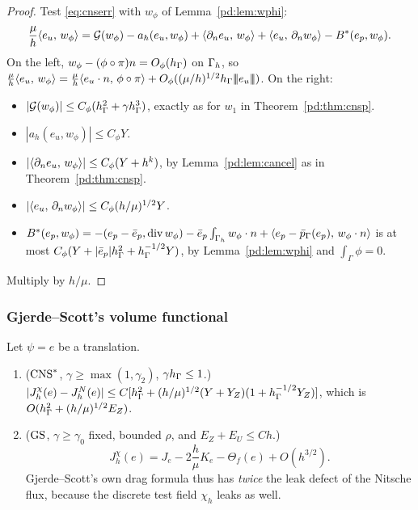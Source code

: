 \begin{proof}
Test \eqref{eq:cnserr} with $w_\phi$ of Lemma~\ref{pd:lem:wphi}:
\[
\frac\mu h\langle e_u,\, w_\phi\rangle=\mathcal G(w_\phi)-a_h(e_u,w_\phi)+\langle \partial_n e_u,\, w_\phi\rangle+\langle e_u,\, \partial_n w_\phi\rangle-B^\ast(e_p,w_\phi).
\]
On the left, $w_\phi-(\phi\circ\pi)n=O_\phi(h_\Gamma)$ on $\Gamma_h$, so $\frac\mu h\langle e_u,\, w_\phi\rangle=\frac\mu h\langle e_u\cdot n,\, \phi\circ\pi\rangle+O_\phi((\mu/h)^{1/2}h_\Gamma|\!|\!|e_u|\!|\!|)$. On the right:
\begin{itemize}
\item $|\mathcal G(w_\phi)|\le C_\phi(h_\Gamma^2+\gamma h_\Gamma^3)$, exactly as for $w_1$ in Theorem~\ref{pd:thm:cnsp}.
\item $|a_h(e_u,w_\phi)|\le C_\phi Y$.
\item $|\langle \partial_n e_u,\, w_\phi\rangle|\le C_\phi(Y+h^k)$, by Lemma~\ref{pd:lem:cancel} as in Theorem~\ref{pd:thm:cnsp}.
\item $|\langle e_u,\, \partial_n w_\phi\rangle|\le C_\phi(h/\mu)^{1/2}Y$.
\item $B^\ast(e_p,w_\phi)=-(e_p-\bar e_p,\operatorname{div} w_\phi)-\bar e_p\int_{\Gamma_h}w_\phi\cdot n+\langle e_p-\bar p_{\Gamma}(e_p),\, w_\phi\cdot n\rangle$ is at most $C_\phi(Y+|\bar e_p|h_\Gamma^2+h_\Gamma^{-1/2}Y)$, by Lemma~\ref{pd:lem:wphi} and $\int_\Gamma\phi=0$.
\end{itemize}
Multiply by $h/\mu$.
\end{proof}

\subsubsection{Gjerde--Scott's volume functional}

\begin{proposition}[$J^\chi_h$]\label{pd:prop:chi}
Let $\psi=e$ be a translation.
\begin{enumerate}[label=(\alph*)]
\item ($\mathrm{CNS}^\ast$, $\gamma\ge\max(1,\gamma_2)$, $\gamma h_\Gamma\le1$.) $|J^\chi_h(e)-J^N_h(e)|\le C[h_\Gamma^2+(h/\mu)^{1/2}(Y+Y_Z)(1+h_\Gamma^{-1/2}Y_Z)]$, which is $O(h_\Gamma^2+(h/\mu)^{1/2}E_Z)$.
\item ($\mathrm{GS}$, $\gamma\ge\gamma_0$ fixed, bounded $\rho$, and $E_Z+E_U\le Ch$.)
\[
J^\chi_h(e)=J_e-2\frac h\mu K_e-\Theta_f(e)+O(h^{3/2}).
\]
Gjerde--Scott's own drag formula thus has \emph{twice} the leak defect of the Nitsche flux, because the discrete test field $\chi_h$ leaks as well.
\end{enumerate}
\end{proposition}

